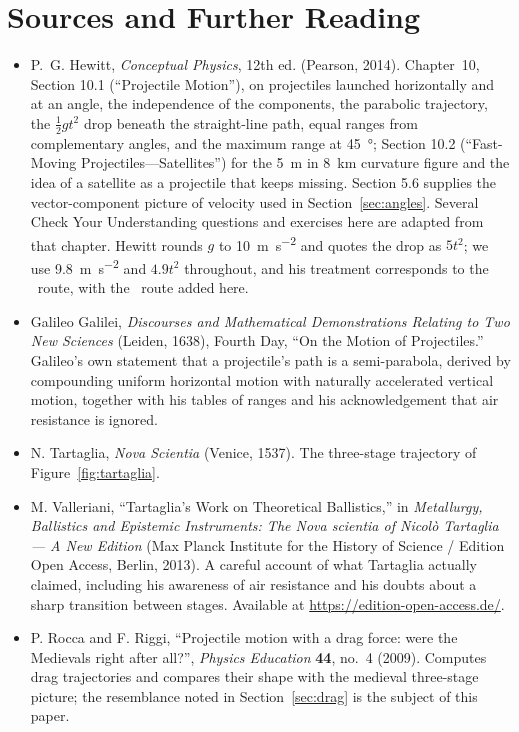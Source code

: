 \documentclass[11pt,twoside,openany]{book}
\newcommand{\viewtag}[3]{\fcolorbox{#2}{#3}{\footnotesize\textbf{\textcolor{#2}{#1}}}}
\newcommand{\elemtag}{\viewtag{Elementary}{elemcol}{elempale}}
\newcommand{\calctag}{\viewtag{Calculus}{calccol}{calcpale}}
\begin{document}
\section*{Sources and Further Reading}
\begin{itemize}[itemsep=3pt]
  \item P.~G. Hewitt, \emph{Conceptual Physics}, 12th ed. (Pearson, 2014). Chapter~10, Section 10.1 (``Projectile Motion''), on projectiles launched horizontally and at an angle, the independence of the components, the parabolic trajectory, the $\tfrac12 g t^2$ drop beneath the straight-line path, equal ranges from complementary angles, and the maximum range at \SI{45}{\degree}; Section 10.2 (``Fast-Moving Projectiles---Satellites'') for the \SI{5}{\metre} in \SI{8}{\kilo\metre} curvature figure and the idea of a satellite as a projectile that keeps missing. Section 5.6 supplies the vector-component picture of velocity used in Section~\ref{sec:angles}. Several Check Your Understanding questions and exercises here are adapted from that chapter. Hewitt rounds $g$ to \SI{10}{\metre\per\second\squared} and quotes the drop as $5t^2$; we use \SI{9.8}{\metre\per\second\squared} and $4.9t^2$ throughout, and his treatment corresponds to the \elemtag\ route, with the \calctag\ route added here.
  \item Galileo Galilei, \emph{Discourses and Mathematical Demonstrations Relating to Two New Sciences} (Leiden, 1638), Fourth Day, ``On the Motion of Projectiles.'' Galileo's own statement that a projectile's path is a semi-parabola, derived by compounding uniform horizontal motion with naturally accelerated vertical motion, together with his tables of ranges and his acknowledgement that air resistance is ignored.
  \item N. Tartaglia, \emph{Nova Scientia} (Venice, 1537). The three-stage trajectory of Figure~\ref{fig:tartaglia}.
  \item M. Valleriani, ``Tartaglia's Work on Theoretical Ballistics,'' in \emph{Metallurgy, Ballistics and Epistemic Instruments: The Nova scientia of Nicol\`o Tartaglia --- A New Edition} (Max Planck Institute for the History of Science / Edition Open Access, Berlin, 2013). A careful account of what Tartaglia actually claimed, including his awareness of air resistance and his doubts about a sharp transition between stages. Available at \url{https://edition-open-access.de/}.
  \item P. Rocca and F. Riggi, ``Projectile motion with a drag force: were the Medievals right after all?'', \emph{Physics Education} \textbf{44}, no.~4 (2009). Computes drag trajectories and compares their shape with the medieval three-stage picture; the resemblance noted in Section~\ref{sec:drag} is the subject of this paper.

\end{itemize}
\end{document}
